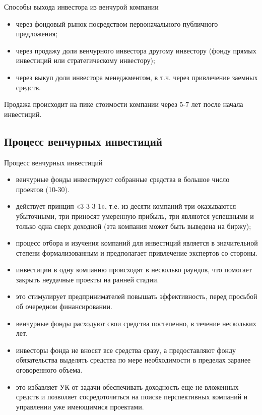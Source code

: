 \documentclass[_Venture_p1.tex]{subfiles}
\begin{document}
\begin{frame}{Способы выхода инвестора из венчурой компании}
\begin{itemize}
	\item через фондовый рынок посредством первоначального публичного предложения;
	\item через продажу доли венчурного инвестора другому инвестору (фонду прямых инвестиций или стратегическому инвестору);
	\item через выкуп доли инвестора менеджментом, в т.ч. через привлечение заемных средств.
\end{itemize}
Продажа происходит на пике стоимости компании через 5-7 лет после начала инвестиций.
\end{frame}

\subsection{\setfontsize{12pt} Процесс венчурных инвестиций}
\begin{frame}[allowframebreaks]{Процесс венчурных инвестиций}
\begin{itemize}
	\item венчурные фонды инвестируют собранные средства в большое число проектов (10-30). 
	\item действует принцип «3-3-3-1», т.е. из десяти компаний три оказываются убыточными, три приносят умеренную прибыль, три являются успешными и только одна сверх доходной (эта компания может быть выведена на биржу);

	\pagebreak
	\item процесс отбора и изучения компаний для инвестиций является в значительной степени формализованным и предполагает привлечение экспертов со стороны.
	\item инвестиции в одну компанию происходят в несколько раундов, что помогает закрыть неудачные проекты на ранней стадии. 
	\item это стимулирует предпринимателей повышать эффективность, перед просьбой об очередном финансировании.
	
	\pagebreak
	\item венчурные фонды расходуют свои средства постепенно, в течение нескольких лет. 
	\item инвесторы фонда не вносят все средства сразу, а предоставляют фонду обязательства выделять средства по мере необходимости в пределах заранее оговоренного объема. 
	\item это избавляет УК от задачи обеспечивать доходность еще не вложенных средств и позволяет сосредоточиться на поиске перспективных компаний и управлении уже имеющимися проектами.
\end{itemize}
\end{frame}
\end{document}
